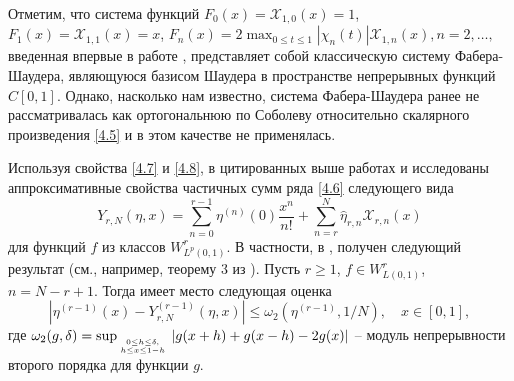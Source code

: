 Отметим, что система функций $F_0(x)=\mathcal{ X}_{1,0}(x)=1$, $F_1(x)=\mathcal{ X}_{1,1}(x)=x$,
$F_n(x)=2\max_{0\le t\le1}|\chi_{n}(t)|\mathcal{ X}_{1,n}(x), n=2,\ldots,$
введенная впервые  в работе \cite{Faber}, представляет собой классическую систему Фабера-Шаудера, являющуюся базисом Шаудера в пространстве непрерывных функций $C[0,1]$.  Однако, насколько нам известно,  система Фабера-Шаудера ранее не рассматривалась как ортогональнюю по Соболеву относительно скалярного произведения \eqref{4.5} и в этом качестве не применялась.

Используя свойства \eqref{4.7} и \eqref{4.8}, в цитированных выше работах  \cite{Shar19} и \cite{Shar20} исследованы аппроксимативные свойства частичных сумм  ряда \eqref{4.6} следующего вида
\begin{equation}\label{4.11}
 Y_{r,N}(\eta,x)=\sum_{n=0}^{r-1} \eta^{(n)}(0)\frac{x^n}{n!}+ \sum_{n=r}^{N}\hat \eta_{r,n}\mathcal{ X}_{r,n}(x)
 \end{equation}
 для функций $f$ из  классов  $W^r_{L^p(0,1)}$. В частности, в \cite{Shar19}, \cite{Shar20} получен следующий результат (см., например, теорему 3 из \cite{Shar20}). Пусть $r\ge1$, $f\in W^r_{L(0,1)}$, $n=N-r+1$.  Тогда имеет место следующая оценка
\begin{equation}\label{4.12}
|\eta^{(r-1)}(x)-Y_{r,N}^{(r-1)}(\eta,x)| \le \omega_2(\eta^{(r-1)},1/N), \quad x\in[0,1],
\end{equation}
где $\omega_2(g,\delta)=\sup_{\atop{ 0\le h\le\delta,\atop h\le x\le 1-h}}|g(x+h)+g(x-h)-2g(x)|$ -- модуль непрерывности второго порядка для функции $g$.

